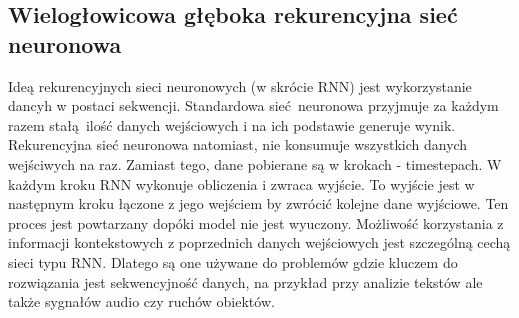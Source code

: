 \subsection{Wielogłowicowa głęboka rekurencyjna sieć neuronowa}
Ideą rekurencyjnych sieci neuronowych (w skrócie RNN) jest wykorzystanie dancyh w postaci sekwencji. 
Standardowa sieć neuronowa przyjmuje za każdym razem stałą ilość danych wejściowych i na ich podstawie generuje wynik. 
Rekurencyjna sieć neuronowa natomiast, nie konsumuje wszystkich danych wejściwych na raz. Zamiast tego,
dane pobierane są w krokach - timestepach. W każdym kroku RNN wykonuje obliczenia i zwraca wyjście. 
To wyjście jest w następnym kroku łączone z jego wejściem by zwrócić kolejne dane wyjściowe. 
Ten proces jest powtarzany dopóki model nie jest wyuczony. Możliwość korzystania z 
informacji kontekstowych z poprzednich danych wejściowych jest szczególną cechą sieci typu RNN. Dlatego
są one używane do problemów gdzie kluczem do rozwiązania jest sekwencyjność danych, na przykład
przy analizie tekstów ale także sygnałów audio czy ruchów obiektów.

